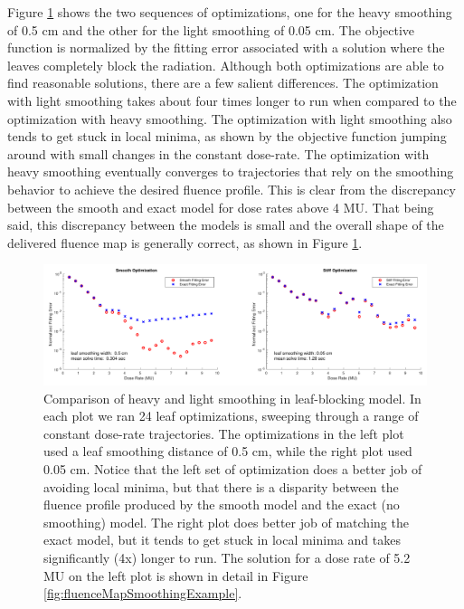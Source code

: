 Figure \ref{fig:smoothVsStiffOptimization} shows the two sequences of optimizations, one for the
heavy smoothing of 0.5 cm and the other for the light smoothing of 0.05 cm.
The objective function is normalized by the fitting error associated with a solution where the
leaves completely block the radiation.
Although both optimizations are able to find reasonable solutions, there are a few salient differences.
The optimization with light smoothing takes about four times longer to run when
compared to the optimization with heavy smoothing.
The optimization with light smoothing also tends to get stuck in local minima, as shown by the
objective function jumping around with small changes in the constant dose-rate.
The optimization with heavy smoothing eventually converges to trajectories that rely on the
smoothing behavior to achieve the desired fluence profile. This is clear from the discrepancy
between the smooth and exact model for dose rates above 4 MU.
That being said, this discrepancy between the models is small and the overall shape of the delivered
fluence map is generally correct, as shown in Figure \ref{fig:smoothVsStiffOptimization}.

\begin{figure}
  \centering
  \includegraphics[width=\textwidth]{fig/smoothVsStiffOptimization.pdf}
  \caption{Comparison of heavy and light smoothing in leaf-blocking model.
           In each plot we ran 24 leaf optimizations, sweeping through a range of constant dose-rate trajectories.
           The optimizations in the left plot used a leaf smoothing distance of 0.5 cm, while the
           right plot used 0.05 cm.
           Notice that the left set of optimization does a better job of avoiding local minima,
           but that there is a disparity between the fluence profile produced by the smooth model
           and the exact (no smoothing) model.
           The right plot does better job of matching the exact model, but it tends to get stuck in local minima
           and takes significantly (4x) longer to run.
           The solution for a dose rate of 5.2 MU on the left plot is
           shown in detail in Figure \ref{fig:fluenceMapSmoothingExample}.
          }
  \label{fig:smoothVsStiffOptimization}
\end{figure}

